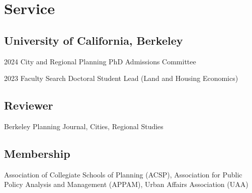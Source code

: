 \documentclass[12pt,letterpaper]{report}
\begin{document}
  \section*{Service}
  \subsection*{University of California, Berkeley}
    \begin{tablist}
        \item[2024] \tab{}City and Regional Planning PhD Admissions Committee
        \item[2023] \tab{}Faculty Search Doctoral Student Lead (Land and Housing Economics)
    \end{tablist}
  \subsection*{Reviewer}
    Berkeley Planning Journal, Cities, Regional Studies
  \subsection*{Membership}
    Association of Collegiate Schools of Planning (ACSP), Association for Public Policy Analysis and Management (APPAM), Urban Affairs Association (UAA)
\end{document}
